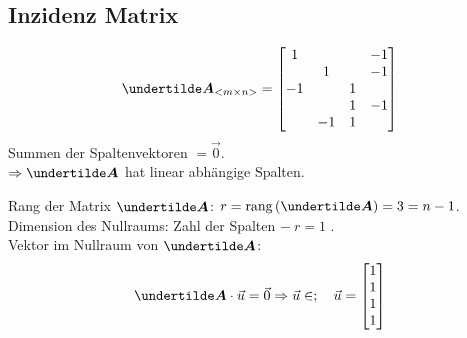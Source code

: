 \subsection{Inzidenz Matrix}
\begin{align*}
\ma{A}_{<m\times n>} = \begin{bmatrix}
1 & & & -1\\
 & 1 & & -1\\
-1 & & 1 & \\
 & & 1 & -1\\
 & -1 & 1 & 
\end{bmatrix}
\end{align*}
Summen der Spaltenvektoren $= \vec{0}$.\\
$\Rightarrow \ma{A}$ hat linear abhängige Spalten.

Rang der Matrix $\ma{A}$: $r = \rang{\ma{A}} = 3 = n-1$.\\
Dimension des Nullraums: Zahl der Spalten $-\ r = 1$ .\\
Vektor im Nullraum von $\ma{A}$:
\begin{align*}
\ma{A}\cdot\vec{u}=\vec{0}\Rightarrow\vec{u}\in ;\quad\vec{u}=\begin{bmatrix}1\\1\\1\\1\end{bmatrix}
\end{align*}

